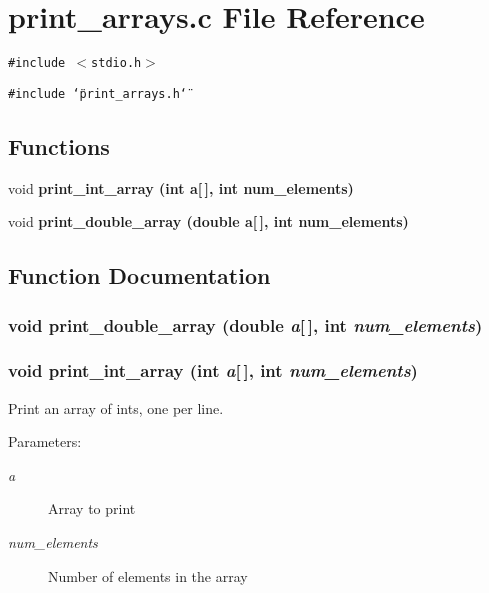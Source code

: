 \section{print\_\-arrays.c File Reference}
\label{print__arrays_8c}
{\tt \#include $<$stdio.h$>$}\par
{\tt \#include \char`\"{}print\_\-arrays.h\char`\"{}}\par
\subsection*{Functions}
\begin{CompactItemize}
\item 
void \bf{print\_\-int\_\-array} (int a[$\,$], int num\_\-elements)
\item 
void \bf{print\_\-double\_\-array} (double a[$\,$], int num\_\-elements)
\end{CompactItemize}


\subsection{Function Documentation}
\subsubsection{\setlength{\rightskip}{0pt plus 5cm}void print\_\-double\_\-array (double {\em a}[$\,$], int {\em num\_\-elements})}\label{print__arrays_8c_9dd571958cd875e3ad558c23cea161d3}


\subsubsection{\setlength{\rightskip}{0pt plus 5cm}void print\_\-int\_\-array (int {\em a}[$\,$], int {\em num\_\-elements})}\label{print__arrays_8c_56fe614d6cfded99e4e9704f9f86ae22}


Print an array of ints, one per line. \begin{Desc}
\item[Parameters:]
\begin{description}
\item[{\em a}]Array to print \item[{\em num\_\-elements}]Number of elements in the array \end{description}
\end{Desc}
